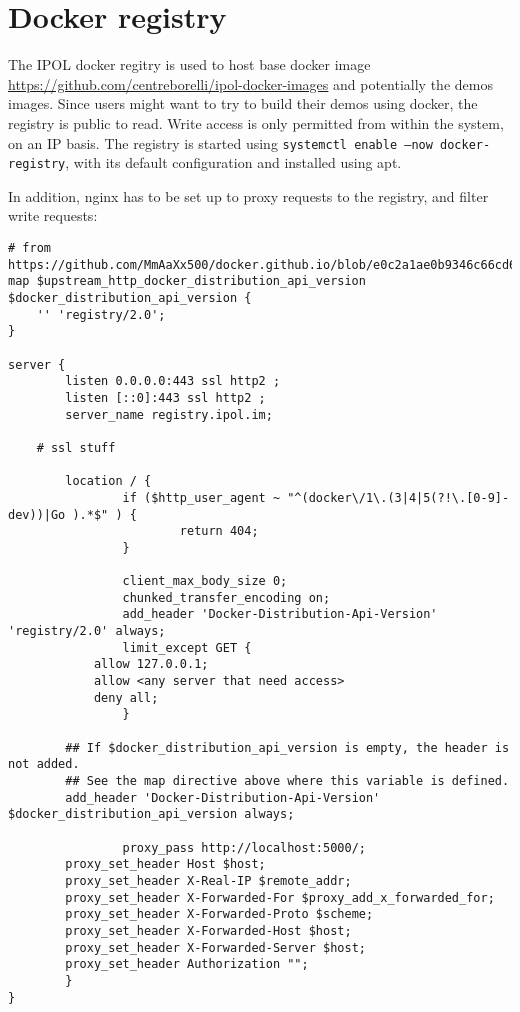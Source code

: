 \documentclass[a4paper,12pt]{article}
\begin{document}
\section{Docker registry}
The IPOL docker regitry is used to host base docker image \url{https://github.com/centreborelli/ipol-docker-images} and potentially the demos images.
Since users might want to try to build their demos using docker, the registry is public to read. Write access is only permitted from within the system, on an IP basis.
The registry is started using {\tt systemctl enable --now docker-registry}, with its default configuration and installed using apt.

In addition, nginx has to be set up to proxy requests to the registry, and filter write requests:

\begin{verbatim}
# from https://github.com/MmAaXx500/docker.github.io/blob/e0c2a1ae0b9346c66cd65d457cd67f130ff440cd/registry/recipes/nginx.md
map $upstream_http_docker_distribution_api_version $docker_distribution_api_version {
	'' 'registry/2.0';
}

server {
        listen 0.0.0.0:443 ssl http2 ;
        listen [::0]:443 ssl http2 ;
        server_name registry.ipol.im;

	# ssl stuff

        location / {
                if ($http_user_agent ~ "^(docker\/1\.(3|4|5(?!\.[0-9]-dev))|Go ).*$" ) {
                        return 404;
                }

                client_max_body_size 0;
                chunked_transfer_encoding on;
                add_header 'Docker-Distribution-Api-Version' 'registry/2.0' always;
                limit_except GET {
			allow 127.0.0.1;
			allow <any server that need access>
			deny all;
                }

		## If $docker_distribution_api_version is empty, the header is not added.
		## See the map directive above where this variable is defined.
		add_header 'Docker-Distribution-Api-Version' $docker_distribution_api_version always;

                proxy_pass http://localhost:5000/;
		proxy_set_header Host $host;
		proxy_set_header X-Real-IP $remote_addr;
		proxy_set_header X-Forwarded-For $proxy_add_x_forwarded_for;
		proxy_set_header X-Forwarded-Proto $scheme;
		proxy_set_header X-Forwarded-Host $host;
		proxy_set_header X-Forwarded-Server $host;
		proxy_set_header Authorization "";
        }
}
\end{verbatim}
\end{document}
